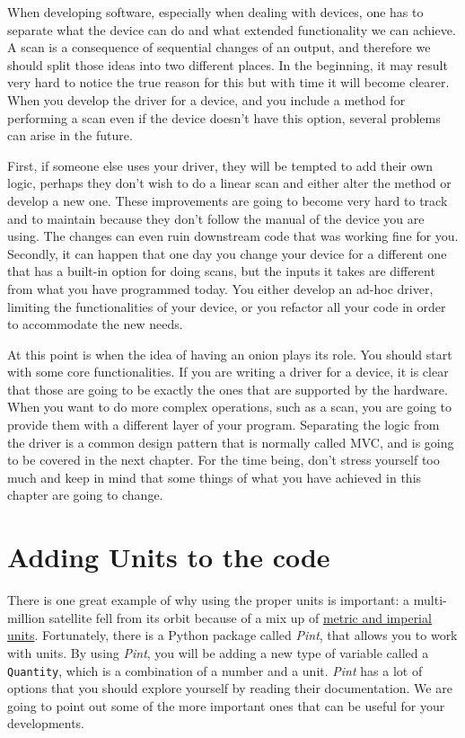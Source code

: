 When developing software, especially when dealing with devices, one has
to separate what the device can do and what extended functionality we
can achieve. A scan is a consequence of sequential changes of an output,
and therefore we should split those ideas into two different places. In
the beginning, it may result very hard to notice the true reason for
this but with time it will become clearer. When you develop the driver
for a device, and you include a method for performing a scan even if the
device doesn't have this option, several problems can arise in
the future.

First, if someone else uses your driver, they will be tempted to add
their own logic, perhaps they don't wish to do a linear scan and either
alter the method or develop a new one. These improvements are going to
become very hard to track and to maintain because they don't follow the
manual of the device you are using. The changes can even ruin downstream
code that was working fine for you. Secondly, it can happen that one day
you change your device for a different one that has a built-in option
for doing scans, but the inputs it takes are different from what you
have programmed today. You either develop an ad-hoc driver, limiting the
functionalities of your device, or you refactor all your code in order
to accommodate the new needs.

At this point is when the idea of having an onion plays its role. You
should start with some core functionalities. If you are writing a driver
for a device, it is clear that those are going to be exactly the ones
that are supported by the hardware. When you want to do more complex
operations, such as a scan, you are going to provide them with a
different layer of your program. Separating the logic from the driver is
a common design pattern that is normally called {MVC}, and is going to
be covered in the next chapter. For the time being, don't stress
yourself too much and keep in mind that some things of what you have
achieved in this chapter are going to change.

\hypertarget{adding-units-to-the-code}{}
\section{Adding Units to the code}\label{adding-units-to-thecode}

There is one great example of why using the proper units is important: a
multi-million satellite fell from its orbit because of a mix up of
\href{http://articles.latimes.com/1999/oct/01/news/mn-17288}{metric and
imperial units}. Fortunately, there is a Python package called
\emph{Pint}, that allows you to work with units. By using \emph{Pint},
you will be adding a new type of variable called a \texttt{Quantity},
which is a combination of a number and a unit. \emph{Pint} has a lot of
options that you should explore yourself by reading their documentation.
We are going to point out some of the more important ones that can be
useful for your developments.

